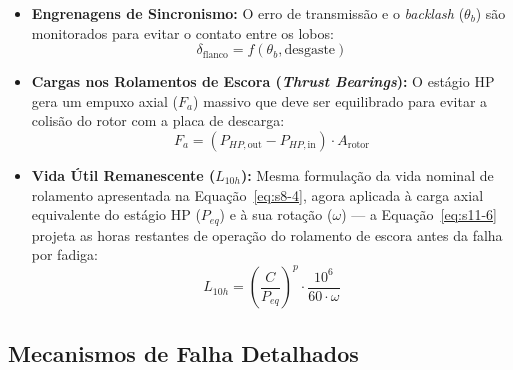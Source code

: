 \documentclass[12pt,a4paper]{article}
\numberwithin{equation}{section}
\numberwithin{table}{section}
\numberwithin{figure}{section}
\begin{document}
	\begin{itemize}
		\item \textbf{Engrenagens de Sincronismo:}
		O erro de transmissão e o \textit{backlash} ($\theta_b$) são monitorados para evitar o contato entre os lobos:
		\begin{equation}\label{eq:s11-4}
 \delta_{\text{flanco}} = f(\theta_b, \text{desgaste}) 
\end{equation}
		
		\item \textbf{Cargas nos Rolamentos de Escora (\textit{Thrust Bearings}):}
		O estágio HP gera um empuxo axial ($F_a$) massivo que deve ser equilibrado para evitar a colisão do rotor com a placa de descarga:
		\begin{equation}\label{eq:s11-5}
 F_a = (P_{HP,\text{out}} - P_{HP,\text{in}}) \cdot A_{\text{rotor}} 
\end{equation}
		
		\item \textbf{Vida Útil Remanescente ($L_{10h}$):} Mesma formulação da vida nominal de rolamento apresentada na Equação~\eqref{eq:s8-4}, agora aplicada à carga axial equivalente do estágio HP ($P_{eq}$) e à sua rotação ($\omega$) — a Equação~\eqref{eq:s11-6} projeta as horas restantes de operação do rolamento de escora antes da falha por fadiga:
		\begin{equation}\label{eq:s11-6}
 L_{10h} = \left( \frac{C}{P_{eq}} \right)^p \cdot \frac{10^6}{60 \cdot \omega}
\end{equation}
	\end{itemize}
	
	\subsection{\textbf{Mecanismos de Falha Detalhados}}
	
\end{document}
